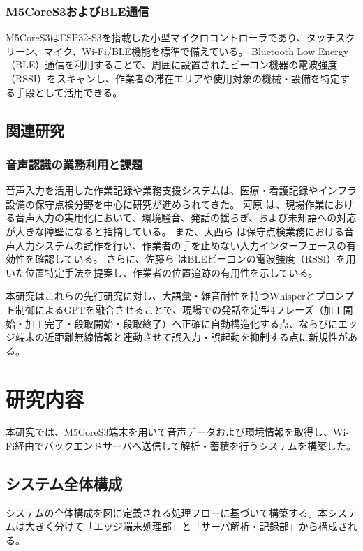 \documentclass[a4paper,12pt,ja=standard,lualatex]{bxjsarticle}
\begin{document}
\subsubsection{M5CoreS3およびBLE通信}
M5CoreS3はESP32-S3を搭載した小型マイクロコントローラであり、タッチスクリーン、マイク、Wi-Fi/BLE機能を標準で備えている。
Bluetooth Low Energy（BLE）通信を利用することで、周囲に設置されたビーコン機器の電波強度（RSSI）をスキャンし、作業者の滞在エリアや使用対象の機械・設備を特定する手段として活用できる。

\subsection{関連研究}
\subsubsection{音声認識の業務利用と課題}
音声入力を活用した作業記録や業務支援システムは、医療・看護記録やインフラ設備の保守点検分野を中心に研究が進められてきた。
河原 \cite{kawahara2016} は、現場作業における音声入力の実用化において、環境騒音、発話の揺らぎ、および未知語への対応が大きな障壁になると指摘している。
また、大西ら \cite{onishi2018} は保守点検業務における音声入力システムの試作を行い、作業者の手を止めない入力インターフェースの有効性を確認している。
さらに、佐藤ら \cite{sato2020} はBLEビーコンの電波強度（RSSI）を用いた位置特定手法を提案し、作業者の位置追跡の有用性を示している。

本研究はこれらの先行研究に対し、大語彙・雑音耐性を持つWhisperとプロンプト制御によるGPTを融合させることで、現場での発話を定型4フレーズ（加工開始・加工完了・段取開始・段取終了）へ正確に自動構造化する点、ならびにエッジ端末の近距離無線情報と連動させて誤入力・誤起動を抑制する点に新規性がある。

\newpage

\section{研究内容}\label{sec3}
本研究では、M5CoreS3端末を用いて音声データおよび環境情報を取得し、Wi-Fi経由でバックエンドサーバへ送信して解析・蓄積を行うシステムを構築した。

\subsection{システム全体構成}
システムの全体構成を図に定義される処理フローに基づいて構築する。本システムは大きく分けて「エッジ端末処理部」と「サーバ解析・記録部」から構成される。
\end{document}
